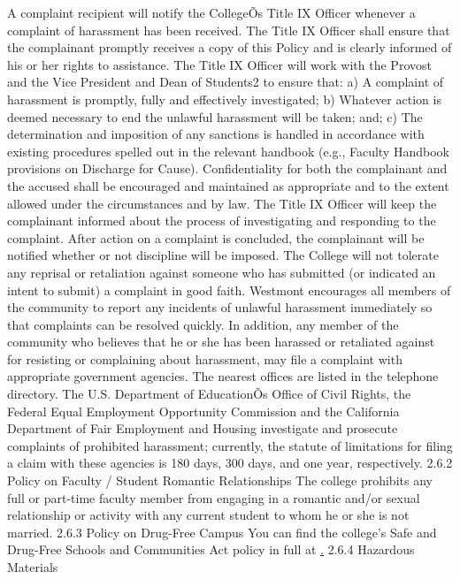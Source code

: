 \documentclass[letterpaper, 11pt]{article}
\begin{document}
   A complaint recipient will notify the CollegeÕs Title IX Officer whenever a complaint of harassment has been received.  The Title IX Officer shall ensure that the complainant promptly receives a copy of this Policy and is clearly informed of his or her rights to assistance.
   The Title IX Officer will work with the Provost and the Vice President and Dean of Students2 to ensure that:
a) A complaint of harassment is promptly, fully and effectively investigated;
b) Whatever action is deemed necessary to end the unlawful harassment will be taken; and;
c) The determination and imposition of any sanctions is handled in accordance with existing procedures spelled out in the relevant handbook (e.g., Faculty Handbook provisions on Discharge for Cause).
   Confidentiality for both the complainant and the accused shall be encouraged and maintained as appropriate and to the extent allowed under the circumstances and by law.
   The Title IX Officer will keep the complainant informed about the process of investigating and responding to the complaint.  After action on a complaint is concluded, the complainant will be notified whether or not discipline will be imposed.  The College will not tolerate any reprisal or retaliation against someone who has submitted (or indicated an intent to submit) a complaint in good faith.
   Westmont encourages all members of the community to report any incidents of unlawful harassment immediately so that complaints can be resolved quickly.  In addition, any member of the community who believes that he or she has been harassed or retaliated against for resisting or complaining about harassment, may file a complaint with appropriate government agencies.  The nearest offices are listed in the telephone directory. The U.S. Department of EducationÕs Office of Civil Rights, the Federal Equal Employment Opportunity Commission and the California Department of Fair Employment and Housing investigate and prosecute complaints of prohibited harassment; currently, the statute of limitations for filing a claim with these agencies is 180 days, 300 days, and one year, respectively.
2.6.2 Policy on Faculty / Student Romantic Relationships
The college prohibits any full or part-time faculty member from engaging in a romantic and/or sexual relationship or activity with any current student to whom he or she is not married.
2.6.3 Policy on Drug-Free Campus
   You can find the college's Safe and Drug-Free Schools and Communities Act policy in full at \href{https://www.westmont.edu/_offices/human_resources/on_campus/handbook/2_7drugfree.html}.
2.6.4 Hazardous Materials
\end{document}

